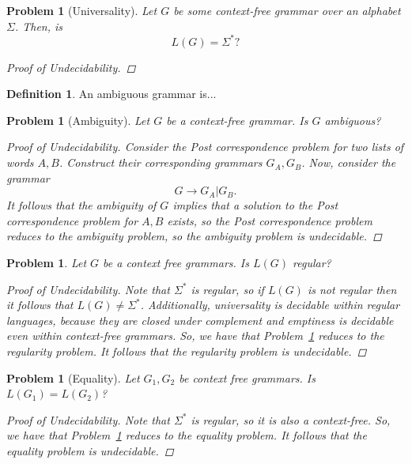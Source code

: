 \documentclass[psamsfonts]{amsart}
\newtheorem{prob}[thm]{Problem}
\theoremstyle{definition}
\newtheorem{defn}[thm]{Definition}
\theoremstyle{remark}
\numberwithin{equation}{section}
\begin{document}
\begin{prob}[Universality]
  \label{prob:cfg:universality}
  Let $G$ be some context-free grammar over an alphabet $\Sigma$. Then, is
  \[
    L(G) = \Sigma^*?
  \]
  \begin{proof}[Proof of Undecidability]\todo{}
    
  \end{proof}
\end{prob}

\begin{defn}
An ambiguous grammar is...
\end{defn}

\begin{prob}[Ambiguity]
  Let $G$ be a context-free grammar. Is $G$ ambiguous?
  \begin{proof}[Proof of Undecidability]
    Consider the Post correspondence problem for two lists of words
    $A,B$. Construct their corresponding grammars $G_A,G_B$. Now, consider the
    grammar
    \[
      G \rightarrow G_A \vert G_B.
    \]
    It follows that the ambiguity of $G$ implies that a solution to the Post
    correspondence problem for $A,B$ exists, so the Post correspondence problem
    reduces to the ambiguity problem, so the ambiguity problem is undecidable.
  \end{proof}
\end{prob}
\cite{greibach66:_unsol_recog_linear_contex_free_languag}
\cite{Hopcroft1969}
\begin{prob}
  Let $G$ be a context free grammars. Is $L(G)$ regular?
  \begin{proof}[Proof of Undecidability]
    Note that $\Sigma^*$ is regular, so if $L(G)$ is not regular then it follows
    that $L(G)\neq \Sigma^*$. Additionally, universality is decidable within
    regular languages, because they are closed under complement and emptiness is
    decidable even within context-free grammars. So, we have that
    Problem~\ref{prob:cfg:universality} reduces to the regularity problem. It
    follows that the regularity problem is undecidable.
  \end{proof}
\end{prob}
\begin{prob}[Equality]
  Let $G_1,G_2$ be context free grammars. Is $L(G_1)=L(G_2)$?
  \begin{proof}[Proof of Undecidability]
    Note that $\Sigma^*$ is regular, so it is also a context-free. So,
    we have that Problem~\ref{prob:cfg:universality} reduces to the equality
    problem. It follows that the equality problem is undecidable.
  \end{proof}
\end{prob}
\end{document}
